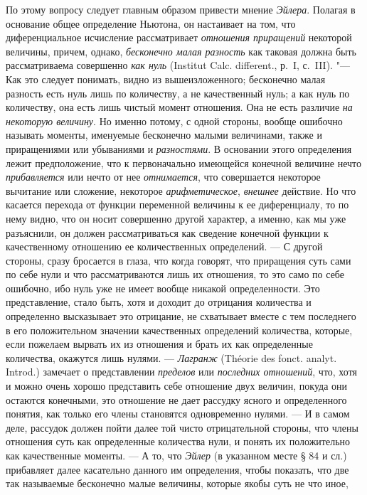 {По этому вопросу следует главным образом привести мнение
{\em Эйлера}. Полагая в основание общее определение
Ньютона, он настаивает на том, что диференциальное исчисление рассматривает
{\em отношения приращений} некоторой величины, причем,
однако, {\em бесконечно малая разность} как таковая
должна быть рассматриваема совершенно {\em как нуль}
(Institut Calc. different., р.~I, с.~III).
"--- Как это следует понимать, видно из
вышеизложенного; бесконечно малая разность есть нуль лишь по количеству, а
не качественный нуль; а как нуль по количеству, она есть лишь чистый момент
отношения. Она не есть различие {\em на некоторую
величину}. Но именно потому, с одной стороны, вообще ошибочно называть
моменты, именуемые бесконечно малыми величинами, также и приращениями или
убываниями и {\em разностями}. В основании этого
определения лежит предположение, что к первоначально имеющейся конечной
величине нечто {\em прибавляется} или нечто от нее
{\em отнимается}, что совершается некоторое вычитание
или сложение, некоторое {\em арифметическое},
{\em внешнее} действие. Но что касается перехода от
функции переменной величины к ее диференциалу, то по нему видно, что он
носит совершенно другой характер, а именно, как мы уже разъяснили, он
должен рассматриваться как сведение конечной функции к качественному
отношению ее количественных определений. — С другой стороны, сразу
бросается в глаза, что когда говорят, что приращения суть сами по себе нули
и что рассматриваются лишь их отношения, то это само по себе ошибочно, ибо
нуль уже не имеет вообще никакой определенности. Это представление, стало
быть, хотя и доходит до отрицания количества и определенно высказывает это
отрицание, не схватывает вместе с тем последнего в его положительном
значении качественных определений количества, которые, если пожелаем
вырвать их из отношения и брать их как определенные количества, окажутся
лишь нулями. — {\em Лагранж} (Théorie des fonct. analyt. Introd.)
замечает о представлении {\em пределов} или {\em последних
отношений}, что, хотя и можно очень хорошо представить себе отношение двух
величин, покуда они остаются конечными, это отношение не дает рассудку
ясного и определенного понятия, как только его члены становятся
одновременно нулями. — И в самом деле, рассудок должен пойти далее той
чисто отрицательной стороны, что члены отношения суть как определенные
количества нули, и понять их положительно как качественные моменты. — А то,
что {\em Эйлер} (в указанном месте § 84 и сл.)
прибавляет далее касательно данного им определения, чтобы показать, что две
так называемые бесконечно малые величины, которые якобы суть не что иное,
}
